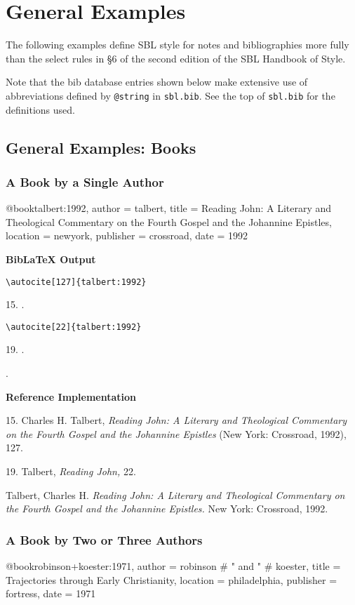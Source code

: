 \documentclass[a4paper]{article}
\newcommand\citetest[5]{%
  {\textbf{BibLaTeX Output}\par
   \nobreak
   \texttt{\textbackslash autocite[#2]\{#5\}}\par
   \color{biblatex-colour}
   #1. \cite[#2]{#5}.\par
   \color{black}
   \texttt{\textbackslash autocite[#4]\{#5\}}\par
   \color{biblatex-colour}
   #3. \cite[#4]{#5}.\par
   \hangindent\bibindent\bibentrycite{#5}.\par}}
\newenvironment{refimp}{%
  \begin{minipage}{\linewidth}
    \setlength{\parskip}{1ex}
    \textbf{Reference Implementation}\par
    \nobreak
    \color{reference-colour}
}{\end{minipage}}
\newenvironment{vb}{%
  \setlength{\parskip}{0pt}
  \verbatim}{\endverbatim}
\begin{document}
\setcounter{section}{5}

\section{General Examples}

The following examples define SBL style for notes and bibliographies more
fully than the select rules in §6 of the second edition of the SBL Handbook of
Style.

Note that the bib database entries shown below make extensive use of
abbreviations defined by \texttt{@string} in \texttt{sbl.bib}. See the top of
\texttt{sbl.bib} for the definitions used.

\setcounter{subsection}{1}
\subsection{General Examples: Books}

\subsubsection{A Book by a Single Author}

\begin{vb}
@book{talbert:1992,
  author = talbert,
  title = {Reading John: A Literary and Theological Commentary
           on the Fourth Gospel and the Johannine Epistles},
  location = newyork,
  publisher = crossroad,
  date = {1992}
}
\end{vb}

\citetest{15}{127}{19}{22}{talbert:1992}


\begin{refimp}
  15. Charles H. Talbert, \emph{Reading John: A Literary and Theological
  Commentary on the Fourth Gospel and the Johannine Epistles} (New York:
  Crossroad, 1992), 127.

  19. Talbert, \emph{Reading John,} 22.

  \hangindent\bibindent Talbert, Charles H. \emph{Reading John: A Literary and
  Theological Commentary on the Fourth Gospel and the Johannine Epistles.} New
  York: Crossroad, 1992.
\end{refimp}

\subsubsection{A Book by Two or Three Authors}

\begin{vb}
@book{robinson+koester:1971,
  author = robinson # " and " # koester,
  title = {Trajectories through Early Christianity},
  location = philadelphia,
  publisher = fortress,
  date = {1971}
}
\end{vb}  
\end{document}
